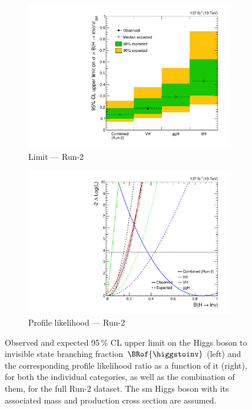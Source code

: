\begin{figure}[htbp]
    \centering
    \begin{subfigure}[b]{0.45\textwidth}  %
        \includegraphics[width=\textwidth]{figures/limits/full_Run2/limit_Run2_comb_per_cat.pdf}
        \caption{Limit --- Run-2}
    \end{subfigure}
    \hspace{0.05\textwidth}
    \begin{subfigure}[b]{0.45\textwidth}
        \includegraphics[width=\textwidth]{figures/likelihood_scan/profile_likelihood_scan_Run2_per_cat.pdf}
        \caption{Profile likelihood --- Run-2}
    \end{subfigure}
    \caption[Observed and expected 95\,\% CL upper limit on the Higgs boson to invisible state branching fraction $\BRof{\higgstoinv}$ and the corresponding profile likelihood ratio as a function of it, for both the individual categories, as well as the combination of them, for the full Run-2 dataset]{Observed and expected 95\,\% CL upper limit on the Higgs boson to invisible state branching fraction $\BRof{\higgstoinv}$ (left) and the corresponding profile likelihood ratio as a function of it (right), for both the individual categories, as well as the combination of them, for the full Run-2 dataset. The \acrlong{sm} Higgs boson with its associated mass and production cross section are assumed.}
    \label{fig:htoinv_limit_likelihood_Run2_per_cat}
\end{figure}

